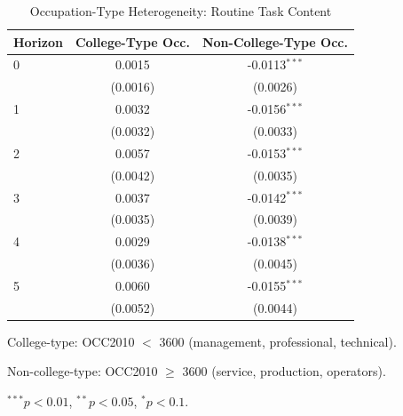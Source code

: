 \begin{table}[htbp]
\centering
\caption{Occupation-Type Heterogeneity: Routine Task Content}
\label{tab:educ}
\begin{tabular}{lcc}
\hline\hline
Horizon & College-Type Occ. & Non-College-Type Occ. \\
\hline
0 & 0.0015 & -0.0113$^{***}$ \\
 & (0.0016) & (0.0026) \\[3pt]
1 & 0.0032 & -0.0156$^{***}$ \\
 & (0.0032) & (0.0033) \\[3pt]
2 & 0.0057 & -0.0153$^{***}$ \\
 & (0.0042) & (0.0035) \\[3pt]
3 & 0.0037 & -0.0142$^{***}$ \\
 & (0.0035) & (0.0039) \\[3pt]
4 & 0.0029 & -0.0138$^{***}$ \\
 & (0.0036) & (0.0045) \\[3pt]
5 & 0.0060 & -0.0155$^{***}$ \\
 & (0.0052) & (0.0044) \\[3pt]
\hline\hline
\end{tabular}
\begin{tablenotes}\small
\item College-type: OCC2010 $<$ 3600 (management, professional, technical).
\item Non-college-type: OCC2010 $\geq$ 3600 (service, production, operators).
\item $^{***}p<0.01$, $^{**}p<0.05$, $^{*}p<0.1$.
\end{tablenotes}
\end{table}